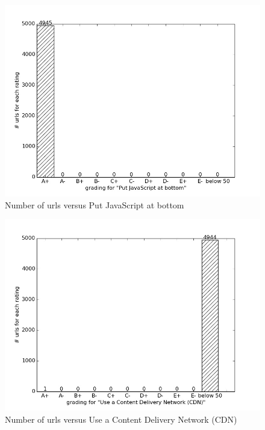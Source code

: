 \documentclass[conference]{IEEEtran}
\begin{document}
\begin{figure}[ht]
 \centering
  \includegraphics[scale=0.33]{img/vlab+/Put JavaScript at bottom.jpg}
\caption{Number of urls versus Put JavaScript at bottom}	
\label{fig:jsatbottom}
\end{figure}
           
\begin{figure}[ht]
 \centering
  \includegraphics[scale=0.33]{new-img-jpg/vlab-jpg/Use a Content Delivery Network (CDN).jpg}
\caption{Number of urls versus Use a Content Delivery Network (CDN)}	
\label{fig:usecdn}
\end{figure}        
\end{document}
